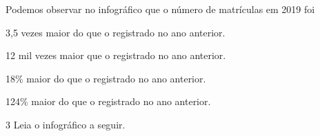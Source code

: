 
Podemos observar no infográfico que o número de matrículas em 2019 foi

\begin{escolha}
\item 3,5 vezes maior do que o registrado no ano anterior.

\item 12 mil vezes maior que o registrado no ano anterior.

\item 18\% maior do que o registrado no ano anterior.

\item 124\% maior do que o registrado no ano anterior.

\end{escolha}

\num{3} Leia o infográfico a seguir.

